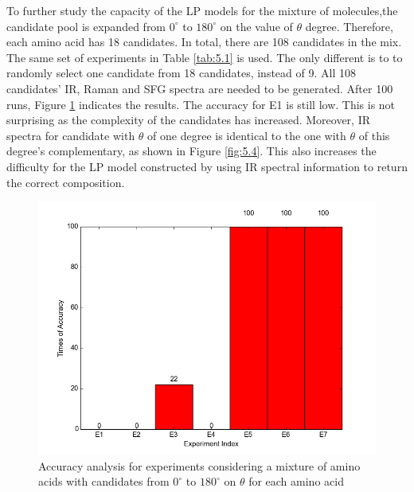 
To further study the capacity of the LP models for the mixture of molecules,the candidate pool is expanded from $0^{\circ}$ to $180^{\circ}$ on the value of $\theta$ degree. Therefore, each amino acid has 18 candidates. In total, there are 108 candidates in the mix. The same set of experiments in Table \ref{tab:5.1} is used. The only different is to to randomly select one candidate from 18 candidates, instead of 9. All 108 candidates' IR, Raman and SFG spectra are needed to be generated. After 100 runs, Figure \ref{fig:5.3} indicates the results. The accuracy for E1 is still low. This is not surprising as the complexity of the candidates has increased. Moreover, IR spectra for candidate with $\theta$ of one degree is identical to the one with $\theta$ of this degree's complementary, as shown in Figure \ref{fig:5.4}. This also increases the difficulty for the LP model constructed by using IR spectral information to return the correct composition. \\

\begin{figure}[!ht]
\centering
\includegraphics[scale=0.7]{Figures/accuracy_pecent_result10_mixture.png}
\caption{Accuracy analysis for experiments considering a mixture of amino acids with candidates from $0^{\circ}$ to $180^{\circ}$ on $\theta$ for each amino acid} \label{fig:5.3}
\end{figure}

